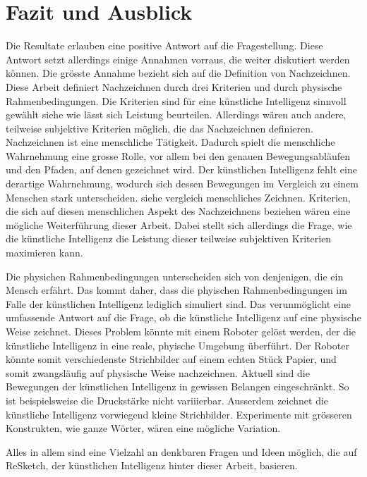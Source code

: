\section{Fazit und Ausblick}
Die Resultate erlauben eine positive Antwort auf die Fragestellung. Diese
Antwort setzt allerdings einige Annahmen vorraus, die weiter diskutiert werden
können. Die grösste Annahme bezieht sich auf die Definition von Nachzeichnen.
Diese Arbeit definiert Nachzeichnen durch drei Kriterien und durch physische
Rahmenbedingungen. Die Kriterien sind für eine künstliche Intelligenz sinnvoll
gewählt {siehe wie lässt sich Leistung beurteilen}. Allerdings wären auch
andere, teilweise subjektive Kriterien möglich, die das Nachzeichnen definieren.
Nachzeichnen ist eine menschliche Tätigkeit. Dadurch spielt die menschliche
Wahrnehmung eine grosse Rolle, vor allem bei den genauen Bewegungsabläufen und
den Pfaden, auf denen gezeichnet wird. Der künstlichen Intelligenz fehlt eine
derartige Wahrnehmung, wodurch sich dessen Bewegungen im Vergleich zu einem
Menschen stark unterscheiden. {siehe vergleich menschliches Zeichnen}.
Kriterien, die sich auf diesen menschlichen Aspekt des Nachzeichnens beziehen
wären eine mögliche Weiterführung dieser Arbeit. Dabei stellt sich allerdings
die Frage, wie die künstliche Intelligenz die Leistung dieser teilweise
subjektiven Kriterien maximieren kann.

Die physichen Rahmenbedingungen unterscheiden sich von denjenigen, die ein
Mensch erfährt. Das kommt daher, dass die phyischen Rahmenbedingungen im Falle
der künstlichen Intelligenz lediglich simuliert sind. Das verunmöglicht eine
umfassende Antwort auf die Frage, ob die künstliche Intelligenz auf eine
physische Weise zeichnet. Dieses Problem könnte mit einem Roboter gelöst werden,
der die künstliche Intelligenz in eine reale, phyische Umgebung überführt. Der
Roboter könnte somit verschiedenste Strichbilder auf einem echten Stück Papier,
und somit zwangsläufig auf physische Weise nachzeichnen. 
Aktuell sind die Bewegungen der künstlichen Intelligenz in gewissen Belangen
eingeschränkt. So ist beispielsweise die Druckstärke nicht variiierbar. Ausserdem
zeichnet die künstliche Intelligenz vorwiegend kleine Strichbilder. Experimente
mit grösseren Konstrukten, wie ganze Wörter, wären eine mögliche Variation.

Alles in allem sind eine Vielzahl an denkbaren Fragen und Ideen möglich, die auf
ReSketch, der künstlichen Intelligenz hinter dieser Arbeit, basieren.




